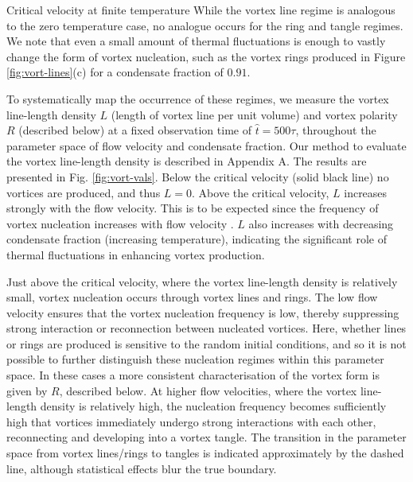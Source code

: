 \begin{chapter}{\label{cha:nonequib}Critical velocity at finite temperature}
While the vortex line regime is analogous to the zero temperature case, no analogue occurs for the ring and tangle regimes.   We note that even a small amount of thermal fluctuations is enough to vastly change the form of vortex nucleation, such as the vortex rings produced in Figure \ref{fig:vort-lines}(c) for a condensate fraction of $0.91$.

To systematically map the occurrence of these regimes, we measure the vortex line-length density $L$ (length of vortex line per unit volume) and vortex polarity $R$ (described below) at a fixed observation time of $\hat{t}=500\tau$, throughout the parameter space of flow velocity and condensate fraction.  Our method to evaluate the vortex line-length density is described in Appendix A.  The results are presented in Fig. \ref{fig:vort-vals}.  Below the critical velocity (solid black line) no vortices are produced, and thus $L=0$.  Above the critical velocity, $L$ increases strongly with the flow velocity.  This is to be expected since the frequency of vortex nucleation increases with flow velocity \cite{frisch92}.  $L$ also increases with decreasing condensate fraction (increasing temperature), indicating the significant role of thermal fluctuations in enhancing vortex production.

Just above the critical velocity, where the vortex line-length density is relatively small, vortex nucleation occurs through vortex lines and rings.  The low flow velocity ensures that the vortex nucleation frequency is low, thereby suppressing strong interaction or reconnection between nucleated vortices.  Here, whether lines or rings are produced is sensitive to the random initial conditions, and so it is not possible to further distinguish these nucleation regimes within this parameter space. In these cases a more consistent characterisation of the vortex form is given by $R$, described below.   At higher flow velocities, where the vortex line-length density is relatively high, the nucleation frequency becomes sufficiently high that vortices immediately undergo strong interactions with each other, reconnecting and developing into a vortex tangle.  The transition in the parameter space from vortex lines/rings to tangles is indicated approximately by the dashed line, although statistical effects blur the true boundary.


\end{chapter}
